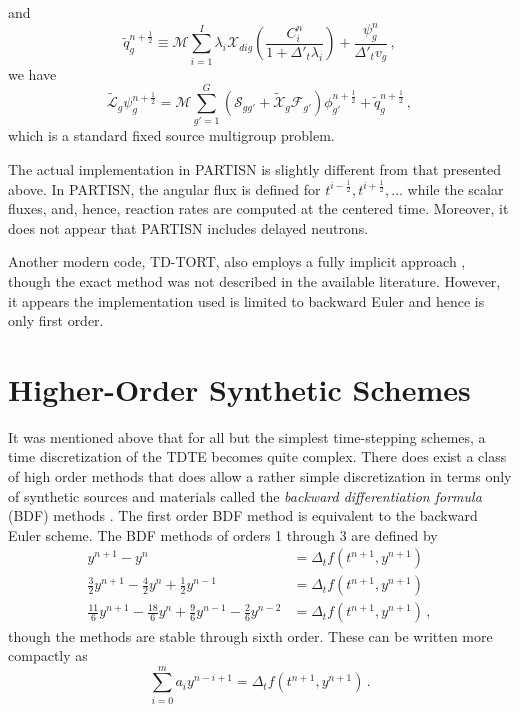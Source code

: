 and
\begin{equation}
 \tilde{q}^{n+\frac{1}{2}}_g \equiv 
   \mathcal{M} \sum_{i=1}^{I} \lambda_i \mathcal{X}_{dig} 
   \left ( 
     \frac{C_i^{n}}{1+\Delta'_t \lambda_i } 
   \right ) + \frac{\psi^{n}_g}{\Delta'_t v_g} \, ,
\end{equation}
we have
\begin{equation}
  \tilde{\mathcal{L}}_g \psi^{n+\frac{1}{2}}_g =  
         \mathcal{M} \sum_{g'=1}^G 
         \left (
           \mathcal{S}_{gg'} + 
           \tilde{\mathcal{X}}_{g}\mathcal{F}_{g'} 
         \right )\phi^{n+\frac{1}{2}}_{g'} 
         + \tilde{q}^{n+\frac{1}{2}}_g \, ,
\end{equation}
which is a standard fixed source multigroup problem.

The actual implementation in PARTISN is slightly different
from that presented above.  In PARTISN, the angular flux is
defined for $t^{i-\frac{1}{2}}, t^{i+\frac{1}{2}}, \ldots$
while the scalar fluxes, and, hence, reaction rates are 
computed at the centered time.  Moreover, it does not 
appear that PARTISN includes delayed neutrons. 

Another modern code, TD-TORT, also employs a fully implicit 
approach \cite{seubert2009tda}, though the exact method was
not described in the available literature.  
However, it appears the implementation used is
limited to backward Euler and hence is only first order.  


\section{Higher-Order Synthetic Schemes}

It was mentioned above that for all but the simplest time-stepping
schemes, a time discretization of the TDTE becomes quite complex.
There does exist a class of high order methods that does allow
a rather simple discretization in terms only of synthetic sources
and materials called the \emph{backward differentiation formula} (BDF) 
methods \cite{leveque2007fdm}.
The first order BDF method is equivalent to the backward Euler scheme.
The BDF methods of orders 1 through 3 are defined by
\begin{equation}
\begin{split}
               y^{n+1} -              y^{n}                                               &= \Delta_t f(t^{n+1}, y^{n+1}) \\
  \frac{ 3}{2} y^{n+1} - \frac{ 4}{ 2}y^{n} + \frac{1}{ 2} y^{n-1}                        &= \Delta_t f(t^{n+1}, y^{n+1}) \\
  \frac{11}{6} y^{n+1} - \frac{18}{ 6}y^{n} + \frac{9}{ 6} y^{n-1} - \frac{2}{6} y^{n-2} &= \Delta_t f(t^{n+1}, y^{n+1}) \, ,
\end{split}
\end{equation}
though the methods are stable through sixth order.  These can be 
written more compactly as
\begin{equation}
   \sum_{i = 0}^{m} a_i y^{n-i+1} =  \Delta_t f(t^{n+1}, y^{n+1}) \, .
\end{equation}


